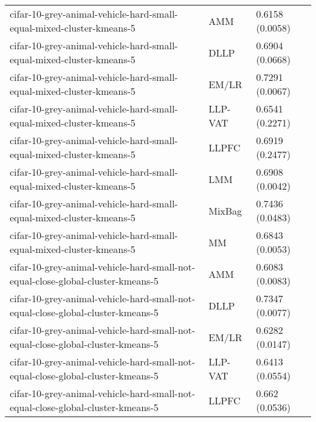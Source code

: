 \begin{longtable}{lll}
                                         cifar-10-grey-animal-vehicle-hard-small-equal-mixed-cluster-kmeans-5 &       AMM &                       0.6158 (0.0058) \\
                                         cifar-10-grey-animal-vehicle-hard-small-equal-mixed-cluster-kmeans-5 &      DLLP &                       0.6904 (0.0668) \\
                                         cifar-10-grey-animal-vehicle-hard-small-equal-mixed-cluster-kmeans-5 &     EM/LR &                       0.7291 (0.0067) \\
                                         cifar-10-grey-animal-vehicle-hard-small-equal-mixed-cluster-kmeans-5 &   LLP-VAT &                       0.6541 (0.2271) \\
                                         cifar-10-grey-animal-vehicle-hard-small-equal-mixed-cluster-kmeans-5 &     LLPFC &                       0.6919 (0.2477) \\
                                         cifar-10-grey-animal-vehicle-hard-small-equal-mixed-cluster-kmeans-5 &       LMM &                       0.6908 (0.0042) \\
                                         cifar-10-grey-animal-vehicle-hard-small-equal-mixed-cluster-kmeans-5 &    MixBag &                       0.7436 (0.0483) \\
                                         cifar-10-grey-animal-vehicle-hard-small-equal-mixed-cluster-kmeans-5 &        MM &                       0.6843 (0.0053) \\
                              cifar-10-grey-animal-vehicle-hard-small-not-equal-close-global-cluster-kmeans-5 &       AMM &                       0.6083 (0.0083) \\
                              cifar-10-grey-animal-vehicle-hard-small-not-equal-close-global-cluster-kmeans-5 &      DLLP &                       0.7347 (0.0077) \\
                              cifar-10-grey-animal-vehicle-hard-small-not-equal-close-global-cluster-kmeans-5 &     EM/LR &                       0.6282 (0.0147) \\
                              cifar-10-grey-animal-vehicle-hard-small-not-equal-close-global-cluster-kmeans-5 &   LLP-VAT &                       0.6413 (0.0554) \\
                              cifar-10-grey-animal-vehicle-hard-small-not-equal-close-global-cluster-kmeans-5 &     LLPFC &                        0.662 (0.0536) \\

\end{longtable}
